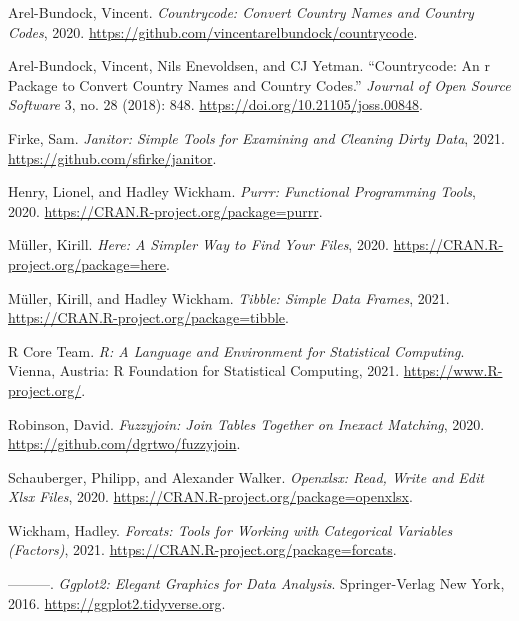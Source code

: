 \documentclass[
  12pt,
]{article}
\newlength{\cslhangindent}
\newenvironment{CSLReferences}[2] %
 {%
  \setlength{\parindent}{0pt}
  \ifodd #1 \everypar{\setlength{\hangindent}{\cslhangindent}}\ignorespaces\fi
  \ifnum #2 > 0
  \setlength{\parskip}{#2\baselineskip}
  \fi
 }%
 {}
\begin{document}
\hypertarget{refs}{}
\begin{CSLReferences}{1}{0}
\leavevmode{}%
Arel-Bundock, Vincent. \emph{Countrycode: Convert Country Names and
Country Codes}, 2020.
\url{https://github.com/vincentarelbundock/countrycode}.

\leavevmode{}%
Arel-Bundock, Vincent, Nils Enevoldsen, and CJ Yetman. {``Countrycode:
An r Package to Convert Country Names and Country Codes.''}
\emph{Journal of Open Source Software} 3, no. 28 (2018): 848.
\url{https://doi.org/10.21105/joss.00848}.

\leavevmode{}%
Firke, Sam. \emph{Janitor: Simple Tools for Examining and Cleaning Dirty
Data}, 2021. \url{https://github.com/sfirke/janitor}.

\leavevmode{}%
Henry, Lionel, and Hadley Wickham. \emph{Purrr: Functional Programming
Tools}, 2020. \url{https://CRAN.R-project.org/package=purrr}.

\leavevmode{}%
Müller, Kirill. \emph{Here: A Simpler Way to Find Your Files}, 2020.
\url{https://CRAN.R-project.org/package=here}.

\leavevmode{}%
Müller, Kirill, and Hadley Wickham. \emph{Tibble: Simple Data Frames},
2021. \url{https://CRAN.R-project.org/package=tibble}.

\leavevmode{}%
R Core Team. \emph{R: A Language and Environment for Statistical
Computing}. Vienna, Austria: R Foundation for Statistical Computing,
2021. \url{https://www.R-project.org/}.

\leavevmode{}%
Robinson, David. \emph{Fuzzyjoin: Join Tables Together on Inexact
Matching}, 2020. \url{https://github.com/dgrtwo/fuzzyjoin}.

\leavevmode{}%
Schauberger, Philipp, and Alexander Walker. \emph{Openxlsx: Read, Write
and Edit Xlsx Files}, 2020.
\url{https://CRAN.R-project.org/package=openxlsx}.

\leavevmode{}%
Wickham, Hadley. \emph{Forcats: Tools for Working with Categorical
Variables (Factors)}, 2021.
\url{https://CRAN.R-project.org/package=forcats}.

\leavevmode{}%
---------. \emph{Ggplot2: Elegant Graphics for Data Analysis}.
Springer-Verlag New York, 2016. \url{https://ggplot2.tidyverse.org}.


\end{CSLReferences}
\end{document}
